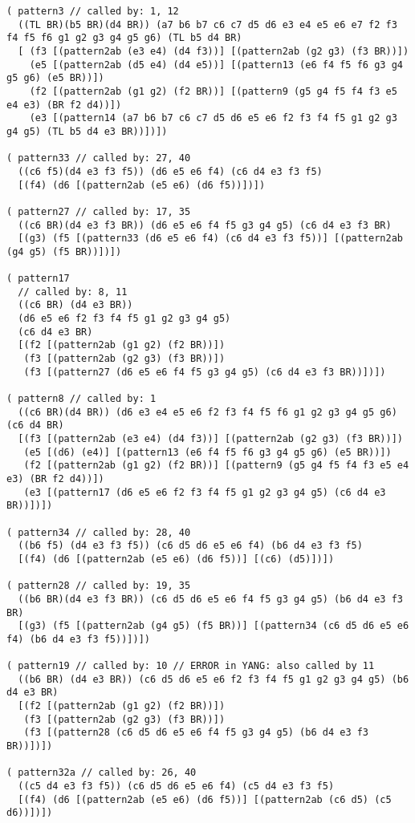 {\begin{verbatim}
( pattern3 // called by: 1, 12
  ((TL BR)(b5 BR)(d4 BR)) (a7 b6 b7 c6 c7 d5 d6 e3 e4 e5 e6 e7 f2 f3 f4 f5 f6 g1 g2 g3 g4 g5 g6) (TL b5 d4 BR)
  [ (f3 [(pattern2ab (e3 e4) (d4 f3))] [(pattern2ab (g2 g3) (f3 BR))])
    (e5 [(pattern2ab (d5 e4) (d4 e5))] [(pattern13 (e6 f4 f5 f6 g3 g4 g5 g6) (e5 BR))])
    (f2 [(pattern2ab (g1 g2) (f2 BR))] [(pattern9 (g5 g4 f5 f4 f3 e5 e4 e3) (BR f2 d4))])
    (e3 [(pattern14 (a7 b6 b7 c6 c7 d5 d6 e5 e6 f2 f3 f4 f5 g1 g2 g3 g4 g5) (TL b5 d4 e3 BR))])])

( pattern33 // called by: 27, 40
  ((c6 f5)(d4 e3 f3 f5)) (d6 e5 e6 f4) (c6 d4 e3 f3 f5)
  [(f4) (d6 [(pattern2ab (e5 e6) (d6 f5))])])

( pattern27 // called by: 17, 35
  ((c6 BR)(d4 e3 f3 BR)) (d6 e5 e6 f4 f5 g3 g4 g5) (c6 d4 e3 f3 BR)
  [(g3) (f5 [(pattern33 (d6 e5 e6 f4) (c6 d4 e3 f3 f5))] [(pattern2ab (g4 g5) (f5 BR))])])

( pattern17
  // called by: 8, 11
  ((c6 BR) (d4 e3 BR))
  (d6 e5 e6 f2 f3 f4 f5 g1 g2 g3 g4 g5)
  (c6 d4 e3 BR)
  [(f2 [(pattern2ab (g1 g2) (f2 BR))])
   (f3 [(pattern2ab (g2 g3) (f3 BR))])
   (f3 [(pattern27 (d6 e5 e6 f4 f5 g3 g4 g5) (c6 d4 e3 f3 BR))])])

( pattern8 // called by: 1
  ((c6 BR)(d4 BR)) (d6 e3 e4 e5 e6 f2 f3 f4 f5 f6 g1 g2 g3 g4 g5 g6) (c6 d4 BR)
  [(f3 [(pattern2ab (e3 e4) (d4 f3))] [(pattern2ab (g2 g3) (f3 BR))])
   (e5 [(d6) (e4)] [(pattern13 (e6 f4 f5 f6 g3 g4 g5 g6) (e5 BR))])
   (f2 [(pattern2ab (g1 g2) (f2 BR))] [(pattern9 (g5 g4 f5 f4 f3 e5 e4 e3) (BR f2 d4))])
   (e3 [(pattern17 (d6 e5 e6 f2 f3 f4 f5 g1 g2 g3 g4 g5) (c6 d4 e3 BR))])])

( pattern34 // called by: 28, 40
  ((b6 f5) (d4 e3 f3 f5)) (c6 d5 d6 e5 e6 f4) (b6 d4 e3 f3 f5)
  [(f4) (d6 [(pattern2ab (e5 e6) (d6 f5))] [(c6) (d5)])])

( pattern28 // called by: 19, 35
  ((b6 BR)(d4 e3 f3 BR)) (c6 d5 d6 e5 e6 f4 f5 g3 g4 g5) (b6 d4 e3 f3 BR)
  [(g3) (f5 [(pattern2ab (g4 g5) (f5 BR))] [(pattern34 (c6 d5 d6 e5 e6 f4) (b6 d4 e3 f3 f5))])])

( pattern19 // called by: 10 // ERROR in YANG: also called by 11
  ((b6 BR) (d4 e3 BR)) (c6 d5 d6 e5 e6 f2 f3 f4 f5 g1 g2 g3 g4 g5) (b6 d4 e3 BR)
  [(f2 [(pattern2ab (g1 g2) (f2 BR))])
   (f3 [(pattern2ab (g2 g3) (f3 BR))])
   (f3 [(pattern28 (c6 d5 d6 e5 e6 f4 f5 g3 g4 g5) (b6 d4 e3 f3 BR))])])

( pattern32a // called by: 26, 40
  ((c5 d4 e3 f3 f5)) (c6 d5 d6 e5 e6 f4) (c5 d4 e3 f3 f5)
  [(f4) (d6 [(pattern2ab (e5 e6) (d6 f5))] [(pattern2ab (c6 d5) (c5 d6))])])


\end{verbatim}}

